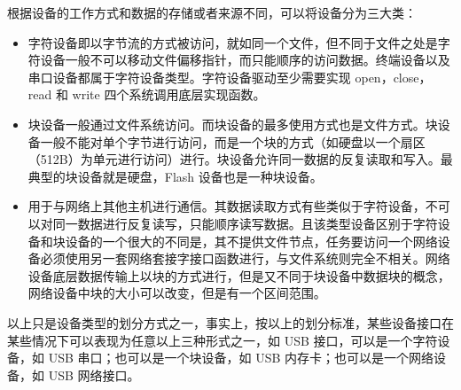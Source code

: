 	根据设备的工作方式和数据的存储或者来源不同，可以将设备分为三大类：
\begin{itemize}
\item {}

	字符设备即以字节流的方式被访问，就如同一个文件，但不同于文件之处是字符设备一般不可以移动文件偏移指针，而只能顺序的访问数据。终端设备以及串口设备都属于字符设备类型。字符设备驱动至少需要实现 open，close，read 和 write 四个系统调用底层实现函数。

\item {}

	块设备一般通过文件系统访问。而块设备的最多使用方式也是文件方式。块设备一般不能对单个字节进行访问，而是一个块的方式（如硬盘以一个扇区（512B）为单元进行访问）进行。块设备允许同一数据的反复读取和写入。最典型的块设备就是硬盘，Flash 设备也是一种块设备。
	
\item {}

	用于与网络上其他主机进行通信。其数据读取方式有些类似于字符设备，不可以对同一数据进行反复读写，只能顺序读写数据。且该类型设备区别于字符设备和块设备的一个很大的不同是，其不提供文件节点，任务要访问一个网络设备必须使用另一套网络套接字接口函数进行，与文件系统则完全不相关。网络设备底层数据传输上以块的方式进行，但是又不同于块设备中数据块的概念，网络设备中块的大小可以改变，但是有一个区间范围。
\end{itemize}

	以上只是设备类型的划分方式之一，事实上，按以上的划分标准，某些设备接口在某些情况下可以表现为任意以上三种形式之一，如 USB 接口，可以是一个字符设备，如 USB 串口；也可以是一个块设备，如 USB 内存卡；也可以是一个网络设备，如 USB 网络接口。

